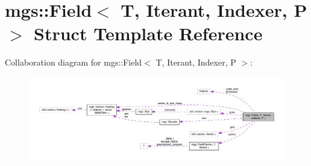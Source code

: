 \hypertarget{structmgs_1_1Field}{}\section{mgs\+:\+:Field$<$ T, Iterant, Indexer, P $>$ Struct Template Reference}
\label{structmgs_1_1Field}


Collaboration diagram for mgs\+:\+:Field$<$ T, Iterant, Indexer, P $>$\+:
\nopagebreak
\begin{figure}[H]
\begin{center}
\leavevmode
\includegraphics[width=350pt]{structmgs_1_1Field__coll__graph}
\end{center}
\end{figure}
